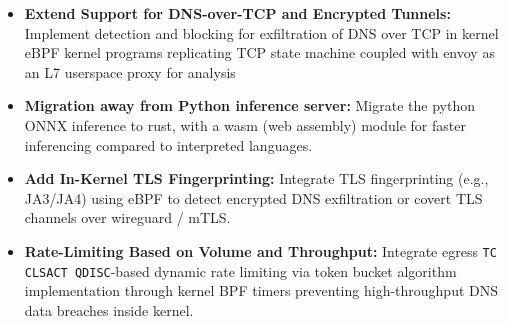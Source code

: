 \documentclass [11pt, proquest] {uwthesis}[2020/02/24]
\begin{document}
\begin{itemize}[itemsep=1pt,parsep=0pt]
  \item \textbf{Extend Support for DNS-over-TCP and Encrypted Tunnels:} Implement detection and blocking for exfiltration of DNS over TCP in kernel eBPF kernel programs replicating TCP state machine coupled with envoy as an L7 userspace proxy for analysis

  \item \textbf{Migration away from Python inference server:} Migrate the python ONNX inference to rust, with a wasm (web assembly) module for faster inferencing compared to interpreted languages.

  \item \textbf{Add In-Kernel TLS Fingerprinting:} Integrate TLS fingerprinting (e.g., JA3/JA4) using eBPF to detect encrypted DNS exfiltration or covert TLS channels over wireguard / mTLS.




  \item \textbf{Rate-Limiting Based on Volume and Throughput:} Integrate egress \texttt{TC CLSACT QDISC}-based dynamic rate limiting via token bucket algorithm implementation through kernel BPF timers preventing high-throughput DNS data breaches inside kernel.


\end{itemize}
\end{document}
